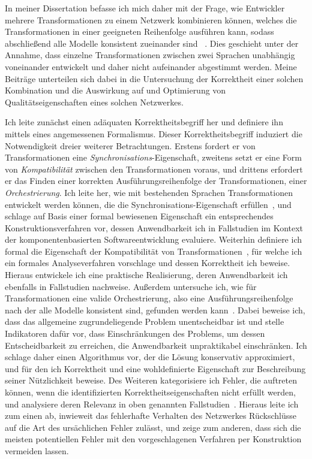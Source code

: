 \documentclass[a4paper,deutsch,CS,11pt,unnummeriert]{KITbrief}
\newcommand\owncite[2][]{
    \cite[#1]{#2}
    \addtocategory{ownpublications}{#2}
}
\begin{document}
In meiner Dissertation befasse ich mich daher mit der Frage, wie Entwickler mehrere Transformationen zu einem Netzwerk kombinieren können, welches die Transformationen in einer geeigneten Reihenfolge ausführen kann, sodass abschließend alle Modelle konsistent zueinander sind~\owncite{klare2020Vitruv-JSS,klare2018docsym}.
Dies geschieht unter der Annahme, dass einzelne Transformationen zwischen zwei Sprachen unabhängig voneinander entwickelt und daher nicht aufeinander abgestimmt werden.
Meine Beiträge unterteilen sich dabei in die Untersuchung der Korrektheit einer solchen Kombination und die Auswirkung auf und Optimierung von Qualitätseigenschaften eines solchen Netzwerkes.

Ich leite zunächst einen adäquaten Korrektheitsbegriff her und definiere ihn mittels eines angemessenen Formalismus.
Dieser Korrektheitsbegriff induziert die Notwendigkeit dreier weiterer Betrachtungen. Erstens fordert er von Transformationen eine \emph{Synchronisations}-Eigenschaft, zweitens setzt er eine Form von \emph{Kompatibilität} zwischen den Transformationen voraus, und drittens erfordert er das Finden einer korrekten Ausführungsreihenfolge der Transformationen, einer \emph{Orchestrierung}.
Ich leite her, wie mit bestehenden Sprachen Transformationen entwickelt werden können, die die Synchronisations-Eigenschaft erfüllen~\cite{klare2019icmt}, und schlage auf Basis einer formal bewiesenen Eigenschaft ein entsprechendes Konstruktionsverfahren vor, dessen Anwendbarkeit ich in Fallstudien im Kontext der komponentenbasierten Softwareentwicklung evaluiere.
Weiterhin definiere ich formal die Eigenschaft der Kompatibilität von Transformationen~\cite{klare2020compatibility-report}, für welche ich ein formales Analyseverfahren vorschlage und dessen Korrektheit ich beweise. Hieraus entwickele ich eine praktische Realisierung, deren Anwendbarkeit ich ebenfalls in Fallstudien nachweise.
Außerdem untersuche ich, wie für Transformationen eine valide Orchestrierung, also eine Ausführungsreihenfolge nach der alle Modelle konsistent sind, gefunden werden kann~\cite{gleitze2020orchestration}.
Dabei beweise ich, dass das allgemeine zugrundeliegende Problem unentscheidbar ist und stelle Indikatoren dafür vor, dass Einschränkungen des Problems, um dessen Entscheidbarkeit zu erreichen, die Anwendbarkeit unpraktikabel einschränken.
Ich schlage daher einen Algorithmus vor, der die Lösung konservativ approximiert, und für den ich Korrektheit und eine wohldefinierte Eigenschaft zur Beschreibung seiner Nützlichkeit beweise. %
Des Weiteren kategorisiere ich Fehler, die auftreten können, wenn die identifizierten Korrektheitseigenschaften nicht erfüllt werden, und analysiere deren Relevanz in oben genannten Fallstudien~\cite{klare2019icmt}.
Hieraus leite ich zum einen ab, inwieweit das fehlerhafte Verhalten des Netzwerkes Rückschlüsse auf die Art des ursächlichen Fehler zulässt, und zeige zum anderen, dass sich die meisten potentiellen Fehler mit den vorgeschlagenen Verfahren per Konstruktion vermeiden lassen.
\end{document}
